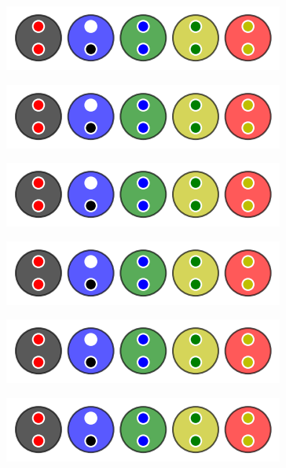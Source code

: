 \vspace{-0.4em}
\begin{multicols}{2}
	\begin{center}   %
		\includegraphics[scale= 0.45]{content/optimal/wheredowego/algo_bubble/000.png}

		\includegraphics[scale= 0.45]{content/optimal/wheredowego/algo_bubble/000.png}

		\includegraphics[scale= 0.45]{content/optimal/wheredowego/algo_bubble/000.png}

		\includegraphics[scale= 0.45]{content/optimal/wheredowego/algo_bubble/000.png}

		\includegraphics[scale= 0.45]{content/optimal/wheredowego/algo_bubble/000.png}
	\end{center}

	\columnbreak
	\begin{center}   %
		\includegraphics[scale= 0.45]{content/optimal/wheredowego/algo_bubble/000.png}


\end{center}
\end{multicols}
